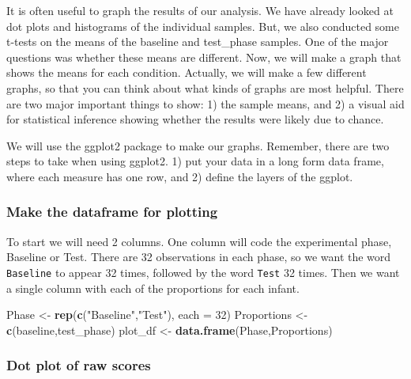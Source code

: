 \documentclass[
]{book}
\newenvironment{Shaded}{\begin{snugshade}}{\end{snugshade}}
\newcommand{\AttributeTok}[1]{\textcolor[rgb]{0.13,0.29,0.53}{#1}}
\newcommand{\DecValTok}[1]{\textcolor[rgb]{0.00,0.00,0.81}{#1}}
\newcommand{\FunctionTok}[1]{\textcolor[rgb]{0.13,0.29,0.53}{\textbf{#1}}}
\newcommand{\NormalTok}[1]{#1}
\newcommand{\OtherTok}[1]{\textcolor[rgb]{0.56,0.35,0.01}{#1}}
\newcommand{\StringTok}[1]{\textcolor[rgb]{0.31,0.60,0.02}{#1}}
\begin{document}
It is often useful to graph the results of our analysis. We have already looked at dot plots and histograms of the individual samples. But, we also conducted some t-tests on the means of the baseline and test\_phase samples. One of the major questions was whether these means are different. Now, we will make a graph that shows the means for each condition. Actually, we will make a few different graphs, so that you can think about what kinds of graphs are most helpful. There are two major important things to show: 1) the sample means, and 2) a visual aid for statistical inference showing whether the results were likely due to chance.

We will use the ggplot2 package to make our graphs. Remember, there are two steps to take when using ggplot2. 1) put your data in a long form data frame, where each measure has one row, and 2) define the layers of the ggplot.

\hypertarget{make-the-dataframe-for-plotting}{%
\subsubsection{Make the dataframe for plotting}\label{make-the-dataframe-for-plotting}}

To start we will need 2 columns. One column will code the experimental phase, Baseline or Test. There are 32 observations in each phase, so we want the word \texttt{Baseline} to appear 32 times, followed by the word \texttt{Test} 32 times. Then we want a single column with each of the proportions for each infant.

\begin{Shaded}
\begin{Highlighting}[]
\NormalTok{Phase }\OtherTok{\textless{}{-}} \FunctionTok{rep}\NormalTok{(}\FunctionTok{c}\NormalTok{(}\StringTok{"Baseline"}\NormalTok{,}\StringTok{"Test"}\NormalTok{), }\AttributeTok{each =} \DecValTok{32}\NormalTok{)}
\NormalTok{Proportions }\OtherTok{\textless{}{-}} \FunctionTok{c}\NormalTok{(baseline,test\_phase)}
\NormalTok{plot\_df }\OtherTok{\textless{}{-}} \FunctionTok{data.frame}\NormalTok{(Phase,Proportions)}
\end{Highlighting}
\end{Shaded}

\hypertarget{dot-plot-of-raw-scores}{%
\subsubsection{Dot plot of raw scores}\label{dot-plot-of-raw-scores}}
\end{document}
